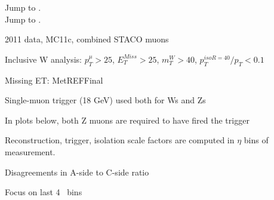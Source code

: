 

{
Jump to \hyperlink{MCP}{}. \\
Jump to \hyperlink{INTERESTING}{}.
}

{

 \iteb
 \item 2011 data, MC11c, combined STACO muons
 \item Inclusive W analysis: $p_T^{\mu}>25$, $E_T^{Miss}>25$, $m_T^{W}>40$, $p_{T}^{iso R=40}/p_{T}<0.1$
 \item Missing ET: MetREFFinal
 \item Single-muon trigger (18 GeV) used both for Ws and Zs
 \iteb
 \item In plots below, both Z muons are required to have fired the trigger
 \itee
 \item Reconstruction, trigger, isolation scale factors are computed in $\eta$ bins of measurement.
 \item Disagreements in A-side to C-side ratio
 \item Focus on last 4 \eta\ bins
 \itee

}

